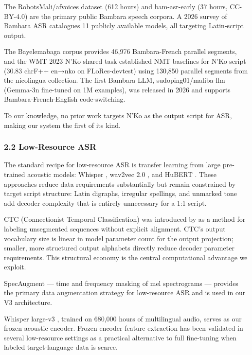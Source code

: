 \documentclass[
]{article}
\begin{document}
The RobotsMali/afvoices dataset (612 hours) and bam-asr-early (37 hours,
CC-BY-4.0) are the primary public Bambara speech corpora. A 2026 survey
of Bambara ASR \cite{bambara_survey_2026} catalogues 11 publicly
available models, all targeting Latin-script output.

The Bayelemabaga corpus \cite{bayelemabaga2025} provides 46,976
Bambara-French parallel segments, and the WMT 2023 N'Ko shared task
\cite{wmt2023nko} established NMT baselines for N'Ko script (30.83
chrF++ en→nko on FLoRes-devtest) using 130,850 parallel segments from
the nicolingua collection. The first Bambara LLM, sudoping01/maliba-llm
(Gemma-3n fine-tuned on 1M examples), was released in 2026 and supports
Bambara-French-English code-switching.

To our knowledge, no prior work targets N'Ko as the output script for
ASR, making our system the first of its kind.

\subsubsection{2.2 Low-Resource ASR}\label{low-resource-asr}

The standard recipe for low-resource ASR is transfer learning from large
pre-trained acoustic models: Whisper \cite{radford2023robust}, wav2vec
2.0 \cite{baevski2020wav2vec}, and HuBERT \cite{hsu2021hubert}. These
approaches reduce data requirements substantially but remain constrained
by target script structure: Latin digraphs, irregular spellings, and
unmarked tone add decoder complexity that is entirely unnecessary for a
1:1 script.

CTC (Connectionist Temporal Classification) was introduced by
\citet{graves2006connectionist} as a method for labeling unsegmented
sequences without explicit alignment. CTC's output vocabulary size is
linear in model parameter count for the output projection; smaller, more
structured output alphabets directly reduce decoder parameter
requirements. This structural economy is the central computational
advantage we exploit.

SpecAugment \cite{park2019specaugment} --- time and frequency masking of
mel spectrograms --- provides the primary data augmentation strategy for
low-resource ASR and is used in our V3 architecture.

Whisper large-v3 \cite{radford2023robust}, trained on 680,000 hours of
multilingual audio, serves as our frozen acoustic encoder. Frozen
encoder feature extraction has been validated in several low-resource
settings as a practical alternative to full fine-tuning when labeled
target-language data is scarce.
\end{document}
